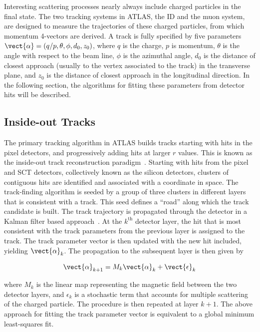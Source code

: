 
Interesting scattering processes nearly always include charged
particles in the final state. The two tracking systems in ATLAS, the ID and the muon
system, are designed to measure the trajectories of these charged
particles, from which momentum 4-vectors are derived. A track is fully
specified by five parameters $\vect{\alpha} =
(q/p,\theta,\phi,d_0,z_0)$, where $q$ is the charge, $p$ is momentum,
$\theta$ is the angle with respect to the beam line, $\phi$ is the
azimuthal angle, $d_0$ is the distance of closest approach (usually to
the vertex associated to the track) in the
transverse plane, and $z_0$ is the distance of closest approach in the
longitudinal direction. In the following section,
the algorithms for fitting these parameters from detector hits will be
described. 

\subsection{Inside-out Tracks}

The primary tracking algorithm in ATLAS builds tracks starting with
hits in the pixel detectors, and progressively adding hits at larger
$r$ values. This is known as the inside-out track reconstruction
paradigm~\cite{bib:Cornelissen:2007vba}. Starting with hits from the pixel and SCT detectors,
collectively known as the silicon detectors, clusters of contiguous
hits are identified and associated with a coordinate in space. The
track-finding algorithm is seeded by a group of three clusters in
different layers that is consistent with a track. This seed defines a
``road'' along which the track candidate is built. The track
trajectory is propagated through the detector in a Kalman filter based
approach~\cite{bib:Fruhwirth:1987fm}. At the $k^{\textrm{th}}$ detector layer, the hit
that is most consistent with the track parameters from the previous
layer is assigned to the track. The track parameter vector is then
updated with the new hit included, yielding $\vect{\alpha}_k$. The propagation to the subsequent
layer is then given by

\begin{equation}
\vect{\alpha}_{k+1} = M_k\vect{\alpha}_{k} + \vect{\epsilon}_{k}
\end{equation}

\noindent
where $M_k$ is the linear map representing the magnetic field between the
two detector layers, and $\epsilon_{k}$ is a stochastic term that
accounts for multiple scattering of the charged particle. The
procedure is then repeated at layer $k+1$. The above approach for
fitting the track parameter vector is equivalent to a global minimum
least-squares fit. 

